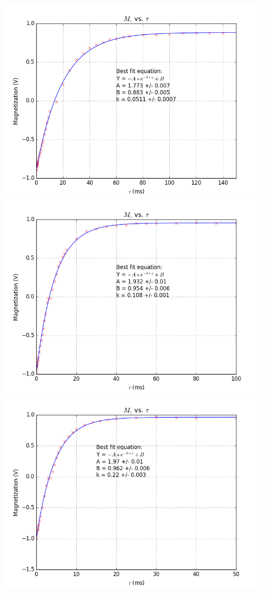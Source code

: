 \documentclass{article}
\begin{document}
{\begin{multicols}{2}
\includegraphics[width=\linewidth]{pic-for-report/a0050M-CuSO4-T1-inset.png}
\label{fig:22}
\includegraphics[width=\linewidth]{pic-for-report/a0100M-CuSO4-T1-inset.png}
\label{fig:23}
\includegraphics[width=\linewidth]{pic-for-report/a0200M-CuSO4-T1-inset.png}

\end{multicols}}
\end{document}
